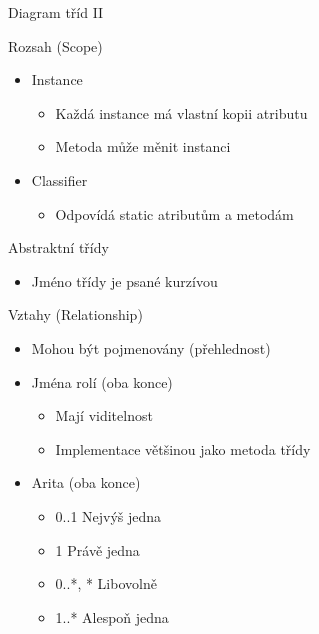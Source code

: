 

\begin{frame}{Diagram tříd II}

\onslide<+->Rozsah (Scope)
\begin{itemize}
    \item<+-> Instance
    \onslide<+->
    \begin{itemize}
        \item Každá instance má vlastní kopii atributu
        \item Metoda může měnit instanci
    \end{itemize}
    
    \item<+-> Classifier
    \onslide<+->
    \begin{itemize}
        \item Odpovídá static atributům a metodám
    \end{itemize}
\end{itemize}

\onslide<+->Abstraktní třídy
\begin{itemize}[<+->]
    \item Jméno třídy je psané kurzívou
\end{itemize}

\onslide<+->Vztahy (Relationship)
\begin{itemize}
    \item<+-> Mohou být pojmenovány (přehlednost)
    \item<+-> Jména rolí (oba konce)
    \onslide<+->
    \begin{itemize}
        \item Mají viditelnost
        \item Implementace většinou jako metoda třídy
    \end{itemize}
    
    \item<+-> Arita (oba konce)
    \onslide<+->
    \begin{itemize}
        \item 0..1 Nejvýš jedna
        \item 1 Právě jedna
        \item 0..*, * Libovolně
        \item 1..* Alespoň jedna
    \end{itemize}
\end{itemize}

\end{frame}

